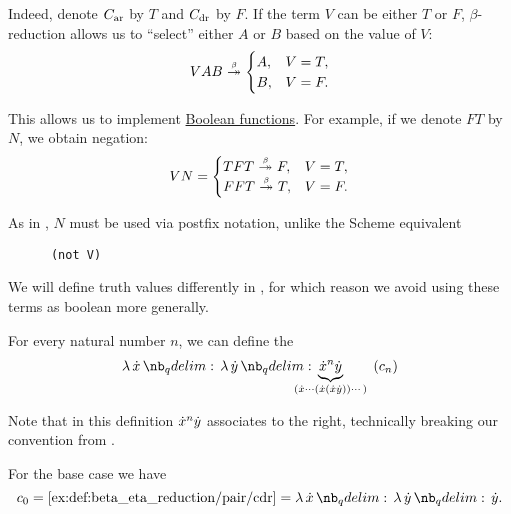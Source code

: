 \begin{example}
\begin{thmenum}
    Indeed, denote \( C_{\T{ar}} \) by \( T \) and \( C_{\T{dr}} \) by \( F \). If the term \( V \) can be either \( T \) or \( F \), \( \beta \)-reduction allows us to \enquote{select} either \( A \) or \( B \) based on the value of \( V \):
    \begin{equation}\label{ex:def:beta_eta_reduction/boolean/if}
      VAB \bred* \begin{cases}
        A, &V = T, \\
        B, &V = F.
      \end{cases}
    \end{equation}

    This allows us to implement \hyperref[def:boolean_function]{Boolean functions}. For example, if we denote \( FT \) by \( N \), we obtain negation:
    \begin{equation*}
      VN = \begin{cases}
        TFT \bred* F, &V = T, \\
        FFT \bred* T, &V = F.
      \end{cases}
    \end{equation*}

    As in , \( N \) must be used via postfix notation, unlike the Scheme equivalent
    \begin{verbatim}
      (not V)
    \end{verbatim}

    We will define truth values differently in , for which reason we avoid using these terms as boolean more generally.

     For every natural number \( n \), we can define the 
    \begin{align}
      \qabs \synx \qabs \syny \underbrace{\synx^n \syny}_{\mathclap{(\synx \cdots (\synx (\synx \syny)) \cdots)}} \label{eq:ex:def:beta_eta_reduction/numerals} \tag{\ensuremath{ c_n }}
    \end{align}

    Note that in this definition \( {\dot{x}}^n {\dot{y}} \) associates to the right, technically breaking our convention from .

    For the base case we have
    \begin{equation*}
      c_0 = \ref{ex:def:beta_eta_reduction/pair/cdr} = \qabs \synx \qabs \syny \syny.
    \end{equation*}


\end{thmenum}
\end{example}
